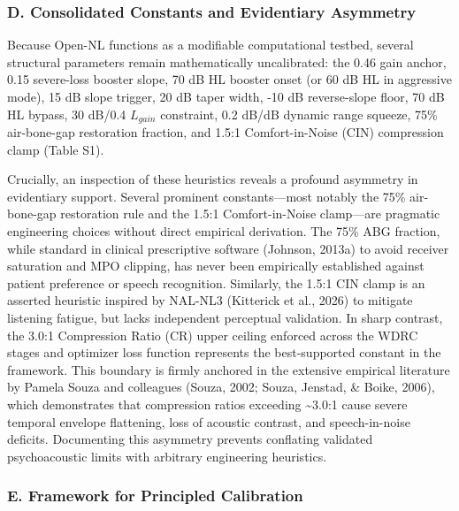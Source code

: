 \documentclass[
  12pt,
]{article}
\begin{document}
\subsubsection{D. Consolidated Constants and Evidentiary
Asymmetry}\label{d.-consolidated-constants-and-evidentiary-asymmetry}

Because Open-NL functions as a modifiable computational testbed, several
structural parameters remain mathematically uncalibrated: the 0.46 gain
anchor, 0.15 severe-loss booster slope, 70 dB HL booster onset (or 60 dB
HL in aggressive mode), 15 dB slope trigger, 20 dB taper width, -10 dB
reverse-slope floor, 70 dB HL bypass, 30 dB/0.4 \(L_{gain}\) constraint,
0.2 dB/dB dynamic range squeeze, 75\% air-bone-gap restoration fraction,
and 1.5:1 Comfort-in-Noise (CIN) compression clamp (Table S1).

Crucially, an inspection of these heuristics reveals a profound
asymmetry in evidentiary support. Several prominent constants---most
notably the 75\% air-bone-gap restoration rule and the 1.5:1
Comfort-in-Noise clamp---are pragmatic engineering choices without
direct empirical derivation. The 75\% ABG fraction, while standard in
clinical prescriptive software (Johnson, 2013a) to avoid receiver
saturation and MPO clipping, has never been empirically established
against patient preference or speech recognition. Similarly, the 1.5:1
CIN clamp is an asserted heuristic inspired by NAL-NL3 (Kitterick et
al., 2026) to mitigate listening fatigue, but lacks independent
perceptual validation. In sharp contrast, the 3.0:1 Compression Ratio
(CR) upper ceiling enforced across the WDRC stages and optimizer loss
function represents the best-supported constant in the framework. This
boundary is firmly anchored in the extensive empirical literature by
Pamela Souza and colleagues (Souza, 2002; Souza, Jenstad, \& Boike,
2006), which demonstrates that compression ratios exceeding
\textasciitilde3.0:1 cause severe temporal envelope flattening, loss of
acoustic contrast, and speech-in-noise deficits. Documenting this
asymmetry prevents conflating validated psychoacoustic limits with
arbitrary engineering heuristics.

\subsubsection{E. Framework for Principled
Calibration}\label{e.-framework-for-principled-calibration}
\end{document}
